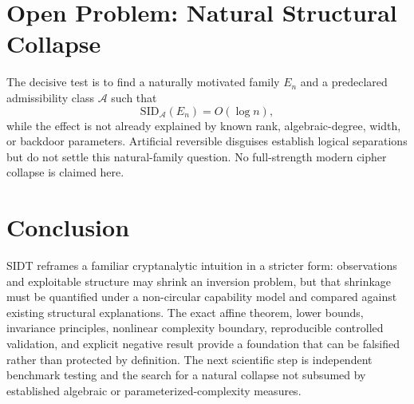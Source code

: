 \documentclass[11pt]{article}
\begin{document}
\section{Open Problem: Natural Structural Collapse}
The decisive test is to find a naturally motivated family $E_n$ and a predeclared admissibility class $\mathcal A$ such that
\[
\mathrm{SID}_{\mathcal A}(E_n)=O(\log n),
\]
while the effect is not already explained by known rank, algebraic-degree, width, or backdoor parameters. Artificial reversible disguises establish logical separations but do not settle this natural-family question. No full-strength modern cipher collapse is claimed here.

\section{Conclusion}
SIDT reframes a familiar cryptanalytic intuition in a stricter form: observations and exploitable structure may shrink an inversion problem, but that shrinkage must be quantified under a non-circular capability model and compared against existing structural explanations. The exact affine theorem, lower bounds, invariance principles, nonlinear complexity boundary, reproducible controlled validation, and explicit negative result provide a foundation that can be falsified rather than protected by definition. The next scientific step is independent benchmark testing and the search for a natural collapse not subsumed by established algebraic or parameterized-complexity measures.

\printbibliography
\end{document}
